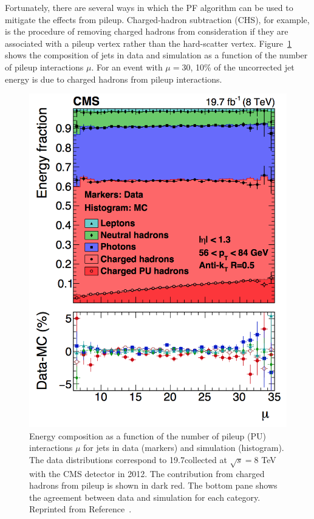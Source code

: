 Fortunately, there are several ways in which the PF algorithm can be used to mitigate the effects from pileup. Charged-hadron subtraction (CHS), for example, is the procedure of removing charged hadrons from consideration if they are associated with a pileup vertex rather than the hard-scatter vertex. Figure~\ref{fig:jetComp} shows the composition of jets in data and simulation as a function of the number of pileup interactions $\mu$. For an event with $\mu = 30$, 10\% of the uncorrected jet energy is due to charged hadrons from pileup interactions. 

 \begin{figure}[h!]
	\centering
	\includegraphics[width=0.8\linewidth]{Figures/EventReconstruction/jetComp.png}
       \caption{Energy composition as a function of the number of pileup (PU) interactions $\mu$ for jets in 
       data (markers) and simulation (histogram). The data distributions correspond to 19.7\fbinv collected at 
       $\sqrt{s} = 8$ TeV with the CMS detector in 2012.
       The contribution from charged hadrons from pileup is shown in dark red.
       The bottom pane shows the agreement between data and simulation for each category.
       Reprinted from Reference~\cite{ParticleFlow}.}
       \label{fig:jetComp}
\end{figure}


